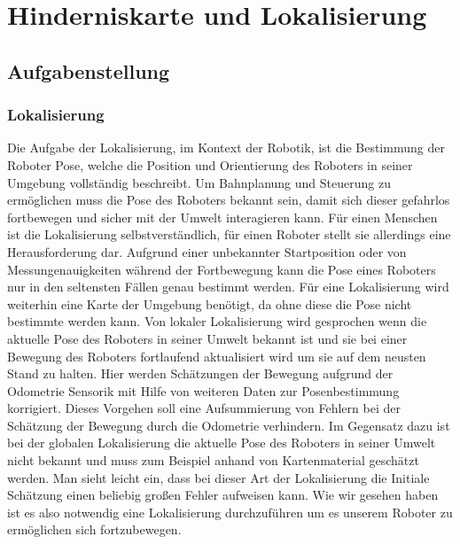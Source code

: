 \chapter{Hinderniskarte und Lokalisierung}
\label{lokalisierung_cha}
\section{Aufgabenstellung}
\label{lokalisierung_aufgabenstellung_sec}
\authorsection{\editorandreas}
\subsection{Lokalisierung}
Die Aufgabe der Lokalisierung, im Kontext der Robotik, ist die Bestimmung der
Roboter Pose, welche die Position und Orientierung des Roboters in seiner Umgebung vollständig beschreibt.
 Um Bahnplanung und Steuerung zu ermöglichen muss die Pose des Roboters bekannt sein,
 damit sich dieser gefahrlos fortbewegen und sicher mit der Umwelt interagieren kann.
 Für einen Menschen ist die Lokalisierung selbstverständlich, für einen Roboter
 stellt sie allerdings eine Herausforderung dar.
 Aufgrund einer unbekannter Startposition oder von Messungenauigkeiten während
 der Fortbewegung kann die Pose eines Roboters nur in den seltensten Fällen genau bestimmt werden. Für eine Lokalisierung wird weiterhin eine Karte der Umgebung benötigt,
 da ohne diese die Pose nicht bestimmte werden kann. Von lokaler Lokalisierung wird gesprochen wenn die aktuelle Pose des Roboters
 in seiner Umwelt bekannt ist und sie bei einer Bewegung des Roboters
 fortlaufend aktualisiert wird um sie auf dem neusten Stand zu halten. Hier
 werden Schätzungen der Bewegung aufgrund der Odometrie Sensorik mit Hilfe von weiteren Daten zur Posenbestimmung korrigiert. Dieses Vorgehen soll eine Aufsummierung von Fehlern bei der
 Schätzung der Bewegung durch die Odometrie verhindern. Im Gegensatz dazu ist
 bei der globalen Lokalisierung die aktuelle Pose des Roboters in seiner Umwelt
 nicht bekannt und muss zum Beispiel anhand von Kartenmaterial geschätzt werden.
 Man sieht leicht ein, dass bei dieser Art der Lokalisierung die Initiale
 Schätzung einen beliebig großen Fehler aufweisen kann. Wie wir gesehen haben
 ist es also notwendig eine Lokalisierung durchzuführen um es unserem Roboter zu
 ermöglichen sich fortzubewegen.
